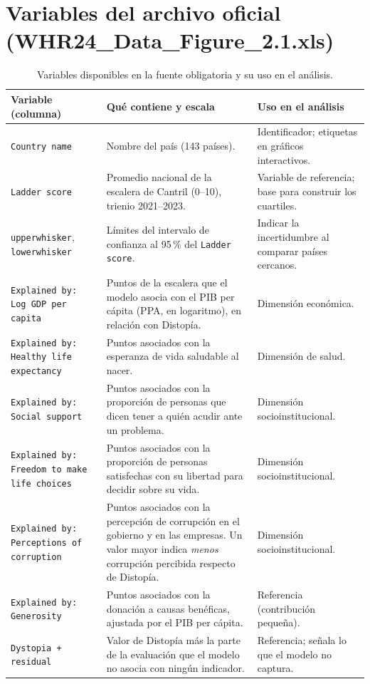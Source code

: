 \documentclass[11pt,a4paper]{article}
\begin{document}
\section{Variables del archivo oficial (WHR24\_Data\_Figure\_2.1.xls)}

\begin{table}[h]
\centering
\caption{Variables disponibles en la fuente obligatoria y su uso en el análisis.}
\small
\begin{tabularx}{\textwidth}{@{}p{3.6cm}LL@{}}
\toprule
\textbf{Variable (columna)} & \textbf{Qué contiene y escala} & \textbf{Uso en el análisis} \\
\midrule
\texttt{Country name} & Nombre del país (143 países). & Identificador; etiquetas en gráficos interactivos. \\
\texttt{Ladder score} & Promedio nacional de la escalera de Cantril (0--10), trienio 2021--2023. & Variable de referencia; base para construir los cuartiles. \\
\texttt{upperwhisker}, \texttt{lowerwhisker} & Límites del intervalo de confianza al 95\,\% del \texttt{Ladder score}. & Indicar la incertidumbre al comparar países cercanos. \\
\texttt{Explained by: Log GDP per capita} & Puntos de la escalera que el modelo asocia con el PIB per cápita (PPA, en logaritmo), en relación con Distopía. & Dimensión económica. \\
\texttt{Explained by: Healthy life expectancy} & Puntos asociados con la esperanza de vida saludable al nacer. & Dimensión de salud. \\
\texttt{Explained by: Social support} & Puntos asociados con la proporción de personas que dicen tener a quién acudir ante un problema. & Dimensión socioinstitucional. \\
\texttt{Explained by: Freedom to make life choices} & Puntos asociados con la proporción de personas satisfechas con su libertad para decidir sobre su vida. & Dimensión socioinstitucional. \\
\texttt{Explained by: Perceptions of corruption} & Puntos asociados con la percepción de corrupción en el gobierno y en las empresas. Un valor mayor indica \emph{menos} corrupción percibida respecto de Distopía. & Dimensión socioinstitucional. \\
\texttt{Explained by: Generosity} & Puntos asociados con la donación a causas benéficas, ajustada por el PIB per cápita. & Referencia (contribución pequeña). \\
\texttt{Dystopia + residual} & Valor de Distopía más la parte de la evaluación que el modelo no asocia con ningún indicador. & Referencia; señala lo que el modelo no captura. \\
\bottomrule
\end{tabularx}
\end{table}
\end{document}
